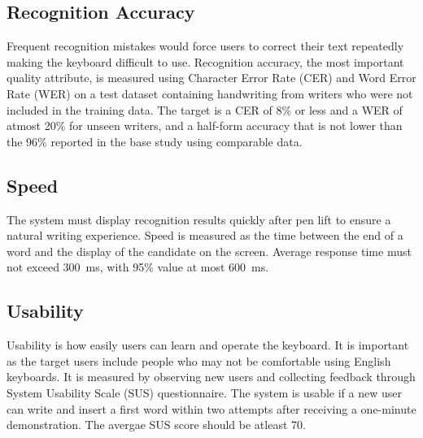 \documentclass[12pt,a4paper]{report}
\begin{document}
\subsection{Recognition Accuracy}
Frequent recognition mistakes would force users to correct their text repeatedly making the keyboard difficult to use. Recognition accuracy, the most important quality attribute, is measured using Character Error Rate (CER) and Word Error Rate (WER) on a test dataset containing handwriting from writers who were not included in the training data. The target is a CER of 8\% or less and a WER of atmost 20\% for unseen writers, and a half-form accuracy that is not lower than the 96\% reported in the base study \cite{safdar2022} using comparable data.   

\subsection{Speed}
The system must display recognition results quickly after pen lift to ensure a natural writing experience. Speed is measured as the time between the end of a word and the display of the candidate on the screen. Average response time must not exceed 300~ms, with 95\% value at most 600~ms.

\subsection{Usability}
Usability is how easily users can learn and operate the keyboard. It is important as the target users include people who may not be comfortable using English keyboards. It is measured by observing new users and collecting feedback through System Usability Scale (SUS) questionnaire. The system is usable if a new user can write and insert a first word within two attempts after receiving a one-minute demonstration. The avergae SUS score should be atleast 70.
\end{document}
